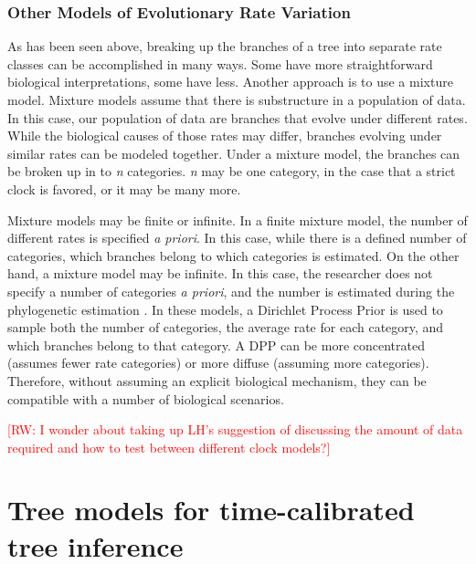 \documentclass[11pt]{article}
\newcommand{\rw}[1]{{\textcolor{red}{[RW: #1]}}} %
\begin{document}
\subsubsection{Other Models of Evolutionary Rate Variation}

As has been seen above, breaking up the branches of a tree into separate rate classes can be accomplished in many ways.
Some have more straightforward biological interpretations, some have less. 
Another approach is to use a mixture model.
Mixture models assume that there is substructure in a population of data.
In this case, our population of data are branches that evolve under different rates.
While the biological causes of those rates may differ, branches evolving under similar rates can be modeled together. 
Under a mixture model, the branches can be broken up in to \textit{n} categories.
\textit{n} may be one category, in the case that a strict clock is favored, or it may be many more.

Mixture models may be finite or infinite.
In a finite mixture model, the number of different rates is specified \textit{a priori}. 
In this case, while there is a defined number of categories, which branches belong to which categories is estimated.
On the other hand, a mixture model may be infinite.
In this case, the researcher does not specify a number of categories \textit{a priori}, and the number is estimated during the phylogenetic estimation \cite{Heath2012a}.
In these models, a Dirichlet Process Prior is used to sample both the number of categories, the average rate for each category, and which branches belong to that category.
A DPP can be more concentrated (assumes fewer rate categories) or more diffuse (assuming more categories).
Therefore, without assuming an explicit biological mechanism, they can be compatible with a number of biological scenarios. 

\rw{I wonder about taking up LH's suggestion of discussing the amount of data required and how to test between different clock models?}

\section{Tree models for time-calibrated tree inference}

\end{document}
